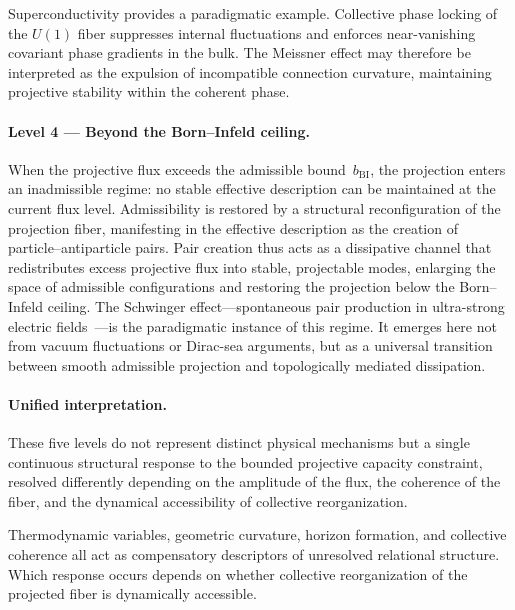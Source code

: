     Superconductivity provides a paradigmatic example.
    Collective phase locking of the $U(1)$ fiber
    suppresses internal fluctuations and enforces
    near-vanishing covariant phase gradients in the bulk.
    The Meissner effect may therefore be interpreted
    as the expulsion of incompatible connection curvature,
    maintaining projective stability within the coherent phase.

  \paragraph{Level 4 --- Beyond the Born--Infeld ceiling.}

    When the projective flux exceeds the admissible bound~$b_{\mathrm{BI}}$,
    the projection enters an inadmissible regime: no stable effective description can
    be maintained at the current flux level.
    Admissibility is restored by a structural reconfiguration of the projection fiber,
    manifesting in the effective description as the creation of particle--antiparticle pairs.
    Pair creation thus acts as a dissipative channel that redistributes excess projective
    flux into stable, projectable modes, enlarging the space of admissible configurations
    and restoring the projection below the Born--Infeld ceiling.
    The Schwinger effect---spontaneous pair production in ultra-strong electric
    fields~\cite{Beau2026f}---is the paradigmatic instance of this regime.
    It emerges here not from vacuum fluctuations or Dirac-sea arguments, but as a
    universal transition between smooth admissible projection and topologically mediated
    dissipation.

  \paragraph{Unified interpretation.}

    These five levels do not represent distinct physical mechanisms but a single
    continuous structural response to the bounded projective capacity constraint,
    resolved differently depending on the amplitude of the flux, the coherence of
    the fiber, and the dynamical accessibility of collective reorganization.

    Thermodynamic variables, geometric curvature, horizon formation, and collective
    coherence all act as compensatory descriptors of unresolved relational structure.
    Which response occurs depends on whether collective reorganization of the projected
    fiber is dynamically accessible.

